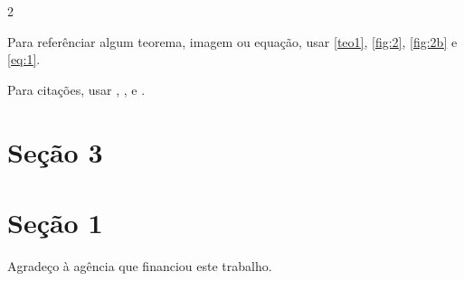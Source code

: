 \documentclass{sciposter}
\begin{document}
\begin{multicols*}{2}
\lipsum[20] %

\vspace{1.2cm}
Para referênciar algum teorema, imagem ou equação, usar \ref{teo1}, \ref{fig:2}, \ref{fig:2b} e \ref{eq:1}.

Para citações, usar \cite{burgos2016solution}, \cite{Eder}, \cite{Leibniz} e \cite{de2001edp}.
\section{\large{Seção 3}} %
\vspace{0.2cm}

\lipsum[5] %

\section*{\large{Seção 1}} %
\vspace{0.2cm}

Agradeço à agência que financiou este trabalho.

\nocite{*}   %



\end{multicols*}
\end{document}

